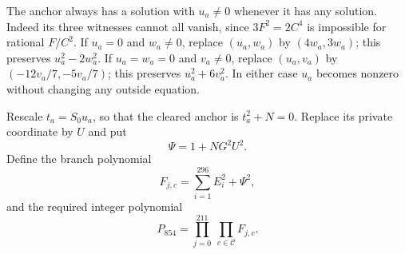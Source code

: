 The anchor always has a solution with $u_a\ne0$ whenever it has any
solution. Indeed its three witnesses cannot all vanish, since
$3F^2=2C^4$ is impossible for rational $F/C^2$. If $u_a=0$ and
$w_a\ne0$, replace $(u_a,w_a)$ by $(4w_a,3w_a)$; this preserves
$u_a^2-2w_a^2$. If $u_a=w_a=0$ and $v_a\ne0$, replace
$(u_a,v_a)$ by $(-12v_a/7,-5v_a/7)$; this preserves
$u_a^2+6v_a^2$. In either case $u_a$ becomes nonzero without
changing any outside equation.

Rescale $t_a=S_0u_a$, so that the cleared anchor is $t_a^2+N=0$.
Replace its private coordinate by $U$ and put
\[
 \Psi=1+NG^2U^2.
\]
Define the branch polynomial
\begin{equation}\label{eq:854-branch}
 F_{j,c}=\sum_{i=1}^{296}E_i^2+\Psi^2,
\end{equation}
and the required integer polynomial
\begin{equation}\label{eq:854-polynomial}
 P_{854}=\prod_{j=0}^{211}\ \prod_{c\in\mathcal C}F_{j,c}.
\end{equation}

